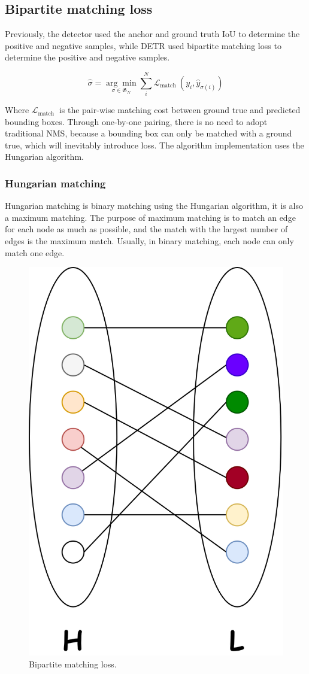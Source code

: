 \subsection{Bipartite matching loss}

Previously, the detector used the anchor and ground truth IoU to determine the positive and negative samples,  while DETR used bipartite matching loss to determine the positive and negative samples. 

\begin{equation}
	\hat{\sigma}=\underset{\sigma \in \mathfrak{G}_{N}}{\arg \min } \sum_{i}^{N} \mathcal{L}_{\text {match }}\left(y_{i}, \hat{y}_{\sigma(i)}\right)
\end{equation}

Where $ \mathcal{L}_{\text {match }} $ is the pair-wise matching cost between ground true and predicted bounding boxes. Through one-by-one pairing, there is no need to adopt traditional NMS, because a bounding box can only be matched with a ground true, which will inevitably introduce loss. The algorithm implementation uses the Hungarian algorithm.

\subsubsection{Hungarian matching }

Hungarian matching is binary matching using the Hungarian algorithm, it is also a maximum matching. The purpose of maximum matching is to match an edge for each node as much as possible, and the match with the largest number of edges is the maximum match. Usually, in binary matching, each node can only match one edge.

\begin{figure}
	\centering
	\includegraphics[width=0.3\linewidth]{figures/matcher}
	\caption[Bipartite matching loss]{Bipartite matching loss.}
	\label{fig:matcher}
\end{figure}


